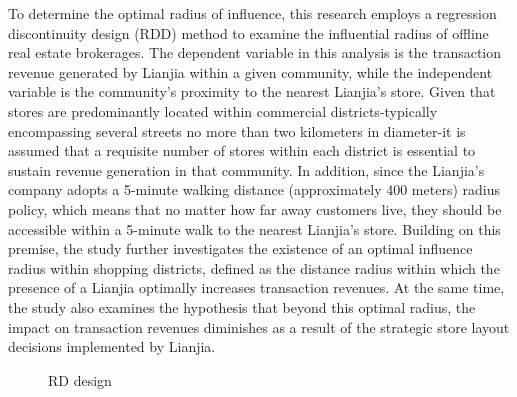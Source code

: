 \documentclass[12pt]{article}
\begin{document}
To determine the optimal radius of influence, this research employs a regression discontinuity design (RDD) method to examine the influential radius of offline real estate brokerages. The dependent variable in this analysis is the transaction revenue generated by Lianjia within a given community, while the independent variable is the community's proximity to the nearest Lianjia's store. Given that stores are predominantly located within commercial districts-typically encompassing several streets no more than two kilometers in diameter-it is assumed that a requisite number of stores within each district is essential to sustain revenue generation in that community. In addition, since the Lianjia's company adopts a 5-minute walking distance (approximately 400 meters) radius policy, which means that no matter how far away customers live, they should be accessible within a 5-minute walk to the nearest Lianjia's store. Building on this premise, the study further investigates the existence of an optimal influence radius within shopping districts, defined as the distance radius within which the presence of a Lianjia optimally increases transaction revenues. At the same time, the study also examines the hypothesis that beyond this optimal radius, the impact on transaction revenues diminishes as a result of the strategic store layout decisions implemented by Lianjia.

\begin{figure}[ht]
    \centering
    \hfill %
    \hfill %
    \caption{RD design}
    \label{fig:RD_design}
\end{figure}
\end{document}
